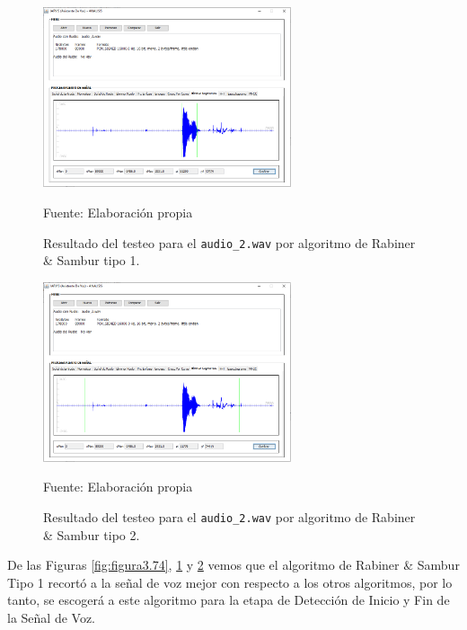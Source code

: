 \vskip -1.0cm

\begin{figure}[H]
\begin{center}
\includegraphics[width=0.65\textwidth]{Imagenes/Cap3/image075}
\end{center}
\begin{center}
\vskip -0.5cm
\caption{\small{Resultado del testeo para el \texttt{audio\_2.wav} por algoritmo de Rabiner \& Sambur tipo 1.}}
\label{fig:figura3.75}
{\small{Fuente: Elaboración propia}}
\end{center}
\end{figure}

\vskip -1.0cm

\begin{figure}[H]
\begin{center}
\includegraphics[width=0.65\textwidth]{Imagenes/Cap3/image076}
\end{center}
\begin{center}
\vskip -0.5cm
\caption{\small{Resultado del testeo para el \texttt{audio\_2.wav} por algoritmo de Rabiner \& Sambur tipo 2.}}
\label{fig:figura3.76}
{\small{Fuente: Elaboración propia}}
\end{center}
\end{figure}

De las Figuras \ref{fig:figura3.74}, \ref{fig:figura3.75} y \ref{fig:figura3.76} vemos que el algoritmo de Rabiner \& Sambur Tipo 1 recortó a la señal de voz mejor con respecto a los otros algoritmos, por lo tanto, se escogerá a este algoritmo para la etapa de Detección de Inicio y Fin de la Señal de Voz.

